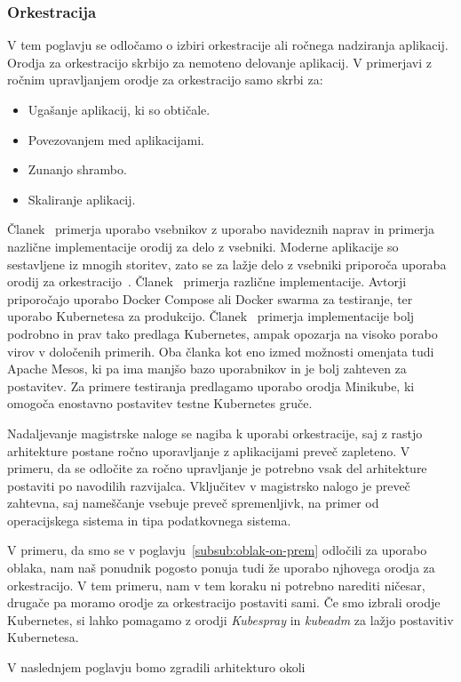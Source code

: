 \subsubsection{Orkestracija}

V tem poglavju se odločamo o izbiri orkestracije ali
ročnega nadziranja aplikacij.
Orodja za orkestracijo skrbijo za nemoteno delovanje aplikacij.
V primerjavi z ročnim upravljanjem orodje za orkestracijo samo skrbi za:
\begin{itemize}
    \item Ugašanje aplikacij, ki so obtičale.
    \item Povezovanjem med aplikacijami.
    \item Zunanjo shrambo.
    \item Skaliranje aplikacij.
\end{itemize}

\noindent Članek~\cite{virtualisation_vs_containerization} primerja uporabo
vsebnikov z uporabo navideznih naprav in primerja
nazlične implementacije orodij za delo z vsebniki.
Moderne aplikacije so sestavljene iz mnogih storitev, zato se za
lažje delo z vsebniki priporoča uporaba orodij za orkestracijo~\cite{container_orchestration}.
Članek~\cite{container_orchestrators_comparison} primerja različne implementacije.
Avtorji priporočajo uporabo Docker Compose ali Docker swarma za testiranje,
ter uporabo Kubernetesa za produkcijo.
Članek~\cite{container_orchestration} primerja implementacije bolj podrobno in
prav tako predlaga Kubernetes,
ampak opozarja na visoko porabo virov v določenih primerih.
Oba članka kot eno izmed možnosti omenjata tudi Apache Mesos,
ki pa ima manjšo bazo uporabnikov in je bolj zahteven za postavitev.
Za primere testiranja predlagamo uporabo orodja Minikube,
ki omogoča enostavno postavitev testne Kubernetes gruče.

Nadaljevanje magistrske naloge se nagiba k uporabi orkestracije,
saj z rastjo arhitekture postane ročno uporavljanje z aplikacijami preveč
zapleteno.
V primeru, da se odločite za ročno upravljanje je potrebno vsak del
arhitekture postaviti po navodilih razvijalca.
Vključitev v magistrsko nalogo je preveč zahtevna,
saj nameščanje vsebuje preveč spremenljivk, na primer 
od operacijskega sistema in tipa podatkovnega sistema.

V primeru, da smo se v poglavju~\ref{subsub:oblak-on-prem} odločili za uporabo oblaka,
nam naš ponudnik pogosto ponuja tudi že uporabo njhovega
orodja za orkestracijo.
V tem primeru, nam v tem koraku ni potrebno narediti ničesar,
drugače pa moramo orodje za orkestracijo postaviti sami.
Če smo izbrali orodje Kubernetes, si lahko pomagamo z orodji \textit{Kubespray} in \textit{kubeadm}
za lažjo postavitiv Kubernetesa.

\bigskip

\noindent V naslednjem poglavju bomo zgradili arhitekturo okoli 
